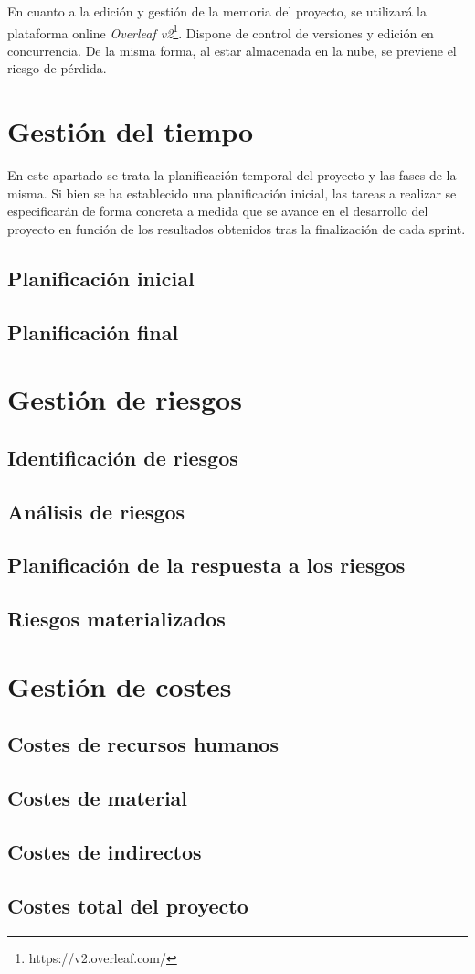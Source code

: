En cuanto a la edición y gestión de la memoria del proyecto, se utilizará la plataforma online \textit{Overleaf v2}\footnote{https://v2.overleaf.com/}. Dispone de control de versiones y edición en concurrencia. De la misma forma, al estar almacenada en la nube, se previene el riesgo de pérdida.

\section{Gestión del tiempo}
En este apartado se trata la planificación temporal del proyecto y las fases de la misma. Si bien se ha  establecido una planificación inicial, las tareas a realizar se especificarán de forma concreta a medida que se avance en el desarrollo del proyecto en función de los resultados obtenidos tras la finalización de cada sprint.

\subsection{Planificación inicial}
\subsection{Planificación final}


\section{Gestión de riesgos}
\subsection{Identificación de riesgos}
\subsection{Análisis de riesgos}
\subsection{Planificación de la respuesta a los riesgos}
\subsection{Riesgos materializados}

\section{Gestión de costes}
\subsection{Costes de recursos humanos}
\subsection{Costes de material}
\subsection{Costes de indirectos}
\subsection{Costes total del proyecto}

